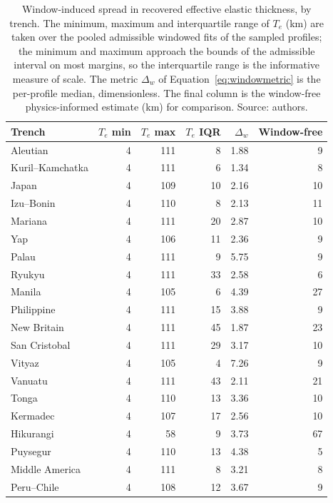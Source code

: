 \documentclass[final]{agujournal2019}
\begin{document}
\begin{table}\centering
  \caption{Window-induced spread in recovered effective elastic thickness, by
  trench. The minimum, maximum and interquartile range of $T_{e}$ (km) are
  taken over the pooled admissible windowed fits of the sampled profiles; the
  minimum and maximum approach the bounds of the admissible interval on most
  margins, so the interquartile range is the informative measure of scale. The
  metric $\Delta_{w}$ of Equation~\eqref{eq:windowmetric} is the per-profile
  median, dimensionless. The final column is the window-free physics-informed
  estimate (km) for comparison. Source: authors.}
  \label{tab:windowspread}
  \begin{tabular}{lrrrrr}
    \toprule
    Trench & $T_e$ min & $T_e$ max & $T_e$ IQR & $\Delta_{w}$ & Window-free \\
    \midrule
    Aleutian         &    4 &  111 &    8 &  1.88 & 9 \\
    Kuril--Kamchatka &    4 &  111 &    6 &  1.34 & 8 \\
    Japan            &    4 &  109 &   10 &  2.16 & 10 \\
    Izu--Bonin       &    4 &  110 &    8 &  2.13 & 11 \\
    Mariana          &    4 &  111 &   20 &  2.87 & 10 \\
    Yap              &    4 &  106 &   11 &  2.36 & 9 \\
    Palau            &    4 &  111 &    9 &  5.75 & 9 \\
    Ryukyu           &    4 &  111 &   33 &  2.58 & 6 \\
    Manila           &    4 &  105 &    6 &  4.39 & 27 \\
    Philippine       &    4 &  111 &   15 &  3.88 & 9 \\
    New Britain      &    4 &  111 &   45 &  1.87 & 23 \\
    San Cristobal    &    4 &  111 &   29 &  3.17 & 10 \\
    Vityaz           &    4 &  105 &    4 &  7.26 & 9 \\
    Vanuatu          &    4 &  111 &   43 &  2.11 & 21 \\
    Tonga            &    4 &  110 &   13 &  3.36 & 10 \\
    Kermadec         &    4 &  107 &   17 &  2.56 & 10 \\
    Hikurangi        &    4 &   58 &    9 &  3.73 & 67 \\
    Puysegur         &    4 &  110 &   13 &  4.38 & 5 \\
    Middle America   &    4 &  111 &    8 &  3.21 & 8 \\
    Peru--Chile      &    4 &  108 &   12 &  3.67 & 9 \\
    \bottomrule
  \end{tabular}
\end{table}
\end{document}
